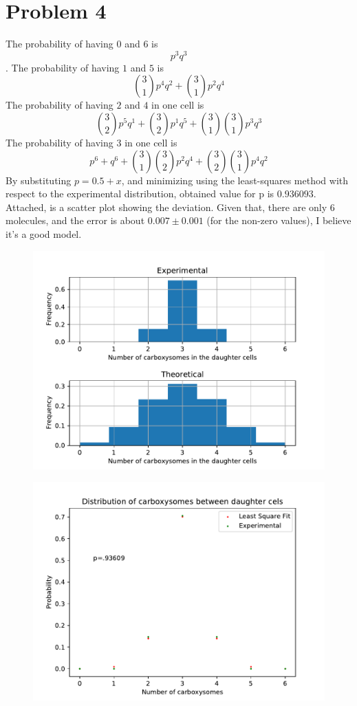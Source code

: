 \documentclass[a4paper]{article}
\begin{document}
\section{Problem 4}
The probability of having $0$ and $6$ is $$p^{3}q^{3}$$. 
The probability of having $1$ and $5$ is 
$$\binom{3}{1}p^{4}q^{2}+\binom{3}{1}p^{2}q^{4}$$
The probability of having $2$ and $4$ in one cell is
$$\binom{3}{2}p^{5}q^{1}+\binom{3}{2}p^{1}q^{5}+\binom{3}{1}\binom{3}{1}p^{3}q^{3}$$
The probability of having $3$ in one cell is
$$p^{6}+q^{6}+\binom{3}{1}\binom{3}{2}p^{2}q^{4}+\binom{3}{2}\binom{3}{1}p^{4}q^{2}$$
By substituting $p=0.5+x$, and minimizing using the least-squares method with respect to the experimental distribution, obtained value for p is $0.936093$.
Attached, is a scatter plot showing the deviation. Given that, there are only 6 molecules, and the error is about $0.007 \pm 0.001$ (for the non-zero values), I believe it's a good model. \newline
\begin{figure}
    \includegraphics{q4.pdf}
    \centering 
\end{figure}
\begin{figure}
\includegraphics{q41.pdf}
\centering 
\end{figure}
\pagebreak
\end{document}
